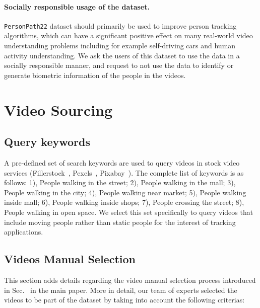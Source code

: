 \documentclass[runningheads]{llncs}
\begin{document}
\paragraph{\textbf{Socially responsible usage of the dataset.}} \texttt{PersonPath22} dataset should primarily be used to improve person tracking algorithms, which can have a significant positive effect on many real-world video understanding problems including for example self-driving cars and human activity understanding. We ask the users of this dataset to use the data in a socially responsible manner, and request to not use the data to identify or generate biometric information of the people in the videos.



%
 
\clearpage


\clearpage


\appendix


\section{Video Sourcing}

\subsection{Query keywords}
A pre-defined set of search keywords are used to query videos in stock video services (Fillerstock~\cite{fillerstock}, Pexels~\cite{pexels}, Pixabay~\cite{pixabay}). The complete list of keywords is as follows: 1), People walking in the street; 2), People walking in the mall; 3), People walking in the city; 4), People walking near market; 5), People walking inside mall; 6), People walking inside shops; 7), People crossing the street; 8), People walking in open space. We select this set specifically to query videos that include moving people rather than  static people for the interest of tracking applications.

\subsection{Videos Manual Selection}
This section adds details regarding the video manual selection process introduced in Sec.~ in the main paper. More in detail, our team of experts selected the videos to be part of the dataset by taking into account the following criterias:
\end{document}
